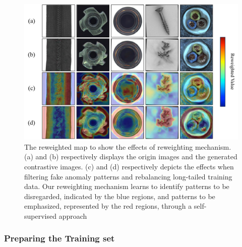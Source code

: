\documentclass[letterpaper]{article} %
\begin{document}
\begin{figure}[!t]
    \centering
    \includegraphics[width=1\linewidth]{images/reweighted_map.pdf}
    \caption{The reweighted map to show the effects of reweighting mechanism. (a) and (b) respectively displays the origin images and the generated contrastive images. (c) and (d) respectively depicts the effects when filtering fake anomaly patterns and rebalancing long-tailed training data. Our reweighting mechanism learns to identify patterns to be disregarded, indicated by the blue regions, and patterns to be emphasized, represented by the red regions, through a self-supervised approach} %
    \label{fig:reweightmap}
\end{figure}

\subsubsection{Preparing the Training set}
\end{document}
